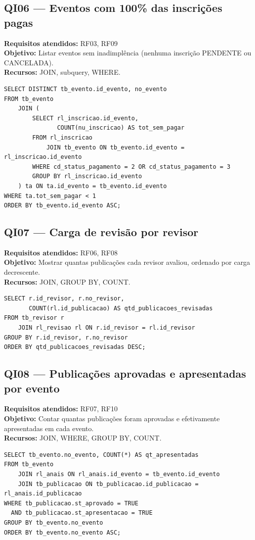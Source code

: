 \documentclass[12pt,a4paper]{article}
\begin{document}
\subsection{QI06 --- Eventos com 100\% das inscrições pagas}
\textbf{Requisitos atendidos:} RF03, RF09 \\
\textbf{Objetivo:} Listar eventos sem inadimplência (nenhuma inscrição PENDENTE ou CANCELADA).\\
\textbf{Recursos:} JOIN, subquery, WHERE.
\begin{lstlisting}[caption={QI06 -- Eventos com todas as inscrições CONCLUIDO.}]
SELECT DISTINCT tb_evento.id_evento, no_evento
FROM tb_evento
    JOIN (
        SELECT rl_inscricao.id_evento,
               COUNT(nu_inscricao) AS tot_sem_pagar
        FROM rl_inscricao
            JOIN tb_evento ON tb_evento.id_evento = rl_inscricao.id_evento
        WHERE cd_status_pagamento = 2 OR cd_status_pagamento = 3
        GROUP BY rl_inscricao.id_evento
    ) ta ON ta.id_evento = tb_evento.id_evento
WHERE ta.tot_sem_pagar < 1
ORDER BY tb_evento.id_evento ASC;
\end{lstlisting}

\subsection{QI07 --- Carga de revisão por revisor}
\textbf{Requisitos atendidos:} RF06, RF08 \\
\textbf{Objetivo:} Mostrar quantas publicações cada revisor avaliou, ordenado por carga decrescente.\\
\textbf{Recursos:} JOIN, GROUP BY, COUNT.
\begin{lstlisting}[caption={QI07 -- Carga de revisão por revisor.}]
SELECT r.id_revisor, r.no_revisor,
       COUNT(rl.id_publicacao) AS qtd_publicacoes_revisadas
FROM tb_revisor r
    JOIN rl_revisao rl ON r.id_revisor = rl.id_revisor
GROUP BY r.id_revisor, r.no_revisor
ORDER BY qtd_publicacoes_revisadas DESC;
\end{lstlisting}

\subsection{QI08 --- Publicações aprovadas e apresentadas por evento}
\textbf{Requisitos atendidos:} RF07, RF10 \\
\textbf{Objetivo:} Contar quantas publicações foram aprovadas e efetivamente apresentadas em cada evento.\\
\textbf{Recursos:} JOIN, WHERE, GROUP BY, COUNT.
\begin{lstlisting}[caption={QI08 -- Aprovadas e apresentadas por evento.}]
SELECT tb_evento.no_evento, COUNT(*) AS qt_apresentadas
FROM tb_evento
    JOIN rl_anais ON rl_anais.id_evento = tb_evento.id_evento
    JOIN tb_publicacao ON tb_publicacao.id_publicacao = rl_anais.id_publicacao
WHERE tb_publicacao.st_aprovado = TRUE
  AND tb_publicacao.st_apresentacao = TRUE
GROUP BY tb_evento.no_evento
ORDER BY tb_evento.no_evento ASC;
\end{lstlisting}
\end{document}
